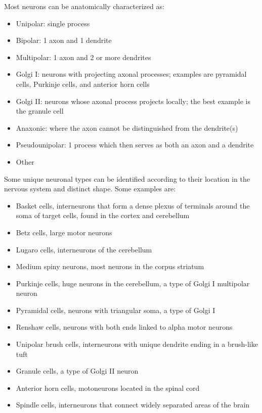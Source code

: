 Most neurons can be anatomically characterized as:

\begin{itemize}
\tightlist
\item
  Unipolar: single process
\item
  Bipolar: 1 axon and 1 dendrite
\item
  Multipolar: 1 axon and 2 or more dendrites
\item
  Golgi I: neurons with projecting axonal processes; examples are pyramidal cells, Purkinje cells, and anterior horn cells
\item
  Golgi II: neurons whose axonal process projects locally; the best example is the granule cell
\item
  Anaxonic: where the axon cannot be distinguished from the dendrite(s)
\item
  Pseudounipolar: 1 process which then serves as both an axon and a dendrite
\item
  Other
\end{itemize}

Some unique neuronal types can be identified according to their location in the nervous system and distinct shape. Some examples are:

\begin{itemize}
\tightlist
\item
  Basket cells, interneurons that form a dense plexus of terminals around the soma of target cells, found in the cortex and cerebellum
\item
  Betz cells, large motor neurons
\item
  Lugaro cells, interneurons of the cerebellum
\item
  Medium spiny neurons, most neurons in the corpus striatum
\item
  Purkinje cells, huge neurons in the cerebellum, a type of Golgi I multipolar neuron
\item
  Pyramidal cells, neurons with triangular soma, a type of Golgi I
\item
  Renshaw cells, neurons with both ends linked to alpha motor neurons
\item
  Unipolar brush cells, interneurons with unique dendrite ending in a brush-like tuft
\item
  Granule cells, a type of Golgi II neuron
\item
  Anterior horn cells, motoneurons located in the spinal cord
\item
  Spindle cells, interneurons that connect widely separated areas of the brain
\end{itemize}

